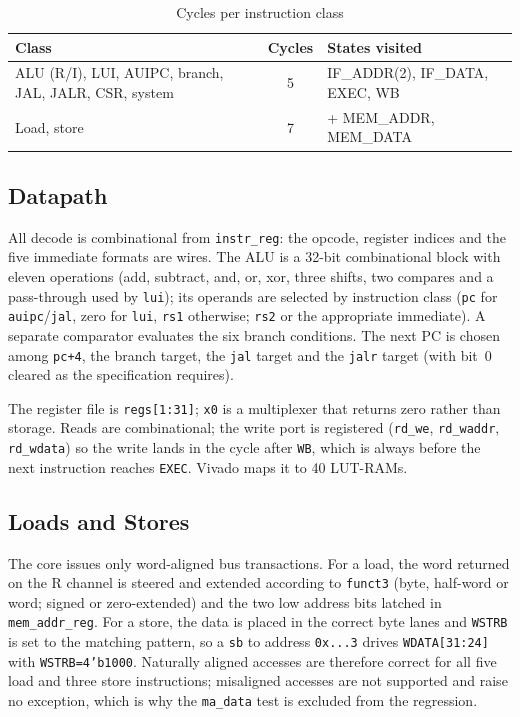 \documentclass[journal,10pt]{IEEEtran}
\newcommand{\reg}[1]{\texttt{#1}}
\begin{document}
\begin{table}[t]
\caption{Cycles per instruction class}
\label{tab:cycles}
\centering
\footnotesize
\begin{tabular}{@{}p{3.8cm}cp{3.1cm}@{}}
\toprule
Class & Cycles & States visited \\
\midrule
ALU (R/I), LUI, AUIPC, branch, JAL, JALR, CSR, system & 5 & IF\_ADDR(2), IF\_DATA, EXEC, WB \\
Load, store & 7 & + MEM\_ADDR, MEM\_DATA \\
\bottomrule
\end{tabular}
\end{table}

\subsection{Datapath}
All decode is combinational from \reg{instr\_reg}: the opcode, register
indices and the five immediate formats are wires. The ALU is a 32-bit
combinational block with eleven operations (add, subtract, and, or, xor,
three shifts, two compares and a pass-through used by \reg{lui}); its
operands are selected by instruction class (\reg{pc} for \reg{auipc}/\reg{jal},
zero for \reg{lui}, \reg{rs1} otherwise; \reg{rs2} or the appropriate
immediate). A separate comparator evaluates the six branch conditions. The
next PC is chosen among \reg{pc+4}, the branch target, the \reg{jal} target
and the \reg{jalr} target (with bit~0 cleared as the specification requires).

The register file is \reg{regs[1:31]}; \reg{x0} is a multiplexer that returns
zero rather than storage. Reads are combinational; the write port is
registered (\reg{rd\_we}, \reg{rd\_waddr}, \reg{rd\_wdata}) so the write
lands in the cycle after \reg{WB}, which is always before the next
instruction reaches \reg{EXEC}. Vivado maps it to 40 LUT-RAMs.

\subsection{Loads and Stores}
The core issues only word-aligned bus transactions. For a load, the word
returned on the R channel is steered and extended according to \reg{funct3}
(byte, half-word or word; signed or zero-extended) and the two low address
bits latched in \reg{mem\_addr\_reg}. For a store, the data is placed in the
correct byte lanes and \reg{WSTRB} is set to the matching pattern, so a
\reg{sb} to address \reg{0x...3} drives \reg{WDATA[31:24]} with
\reg{WSTRB=4'b1000}. Naturally aligned accesses are therefore correct for all
five load and three store instructions; misaligned accesses are not
supported and raise no exception, which is why the \reg{ma\_data} test is
excluded from the regression.
\end{document}
